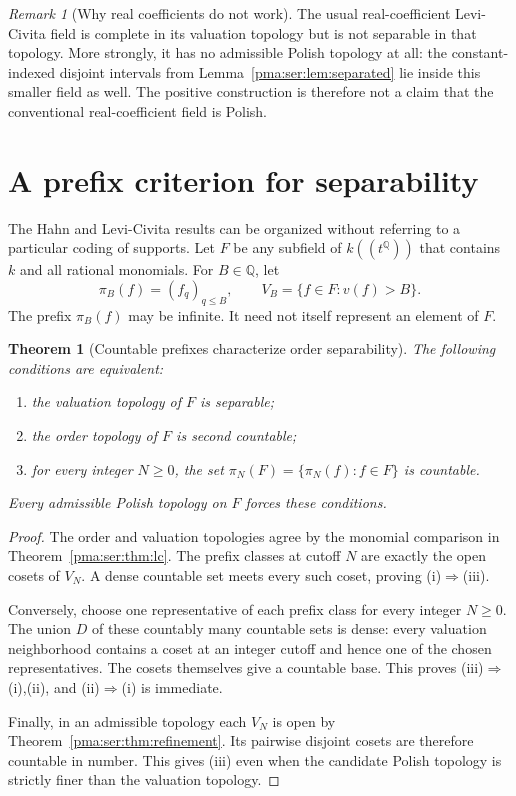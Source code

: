 \documentclass[11pt]{article}
\numberwithin{equation}{section}
\newtheorem{theorem}{Theorem}[section]
\theoremstyle{definition}
\theoremstyle{remark}
\newtheorem{remark}[remark]{Remark}
\newcommand{\Q}{\mathbb Q}
\begin{document}
\begin{remark}[Why real coefficients do not work]
The usual real-coefficient Levi-Civita field is complete in its valuation
topology but is not separable in that topology. More strongly, it has no
admissible Polish topology at all: the constant-indexed disjoint intervals
from Lemma~\ref{pma:ser:lem:separated} lie inside this smaller field as well.
The positive construction is therefore not a claim that the conventional
real-coefficient field is Polish.
\end{remark}

\section{A prefix criterion for separability}
\label{pma:ser:sec:prefix}

The Hahn and Levi-Civita results can be organized without referring to a
particular coding of supports. Let $F$ be any subfield of $k((t^\Q))$ that
contains $k$ and all rational monomials. For $B\in\Q$, let
\[
 \pi_B(f)=(f_q)_{q\leq B},\qquad
 V_B=\{f\in F:v(f)>B\}.
\]
The prefix $\pi_B(f)$ may be infinite. It need not itself represent an
element of $F$.

\begin{theorem}[Countable prefixes characterize order separability]
\label{pma:ser:thm:prefix}
The following conditions are equivalent:
\begin{enumerate}[label=(\roman*)]
\item the valuation topology of $F$ is separable;
\item the order topology of $F$ is second countable;
\item for every integer $N\geq0$, the set
$\pi_N(F)=\{\pi_N(f):f\in F\}$ is countable.
\end{enumerate}
Every admissible Polish topology on $F$ forces these conditions.
\end{theorem}
\begin{proof}
The order and valuation topologies agree by the monomial comparison in
Theorem~\ref{pma:ser:thm:lc}. The prefix classes at cutoff $N$ are exactly the open
cosets of $V_N$. A dense countable set meets every such coset, proving
(i)$\Rightarrow$(iii).

Conversely, choose one representative of each prefix class for every integer
$N\geq0$. The union $D$ of these countably many countable sets is dense:
every valuation neighborhood contains a coset at an integer cutoff and hence
one of the chosen representatives. The cosets themselves give a countable
base. This proves (iii)$\Rightarrow$(i),(ii), and (ii)$\Rightarrow$(i) is
immediate.

Finally, in an admissible topology each $V_N$ is open by
Theorem~\ref{pma:ser:thm:refinement}. Its pairwise disjoint cosets are therefore
countable in number. This gives (iii) even when the candidate Polish topology
is strictly finer than the valuation topology.
\end{proof}
\end{document}

